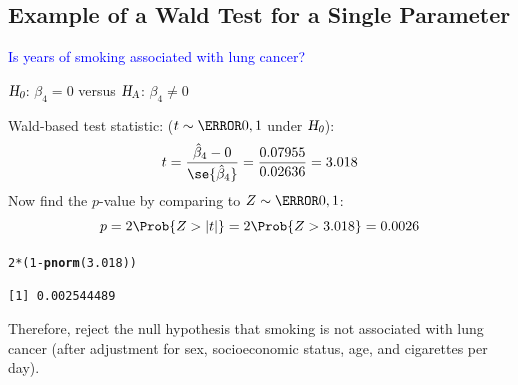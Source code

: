 \documentclass[oneside]{book}\usepackage[]{graphicx}\usepackage[svgnames]{xcolor}
\makeatletter
\newcommand{\hlnum}[1]{\textcolor[rgb]{0.686,0.059,0.569}{#1}}%
\newcommand{\hlopt}[1]{\textcolor[rgb]{0,0,0}{#1}}%
\newcommand{\hlstd}[1]{\textcolor[rgb]{0.345,0.345,0.345}{#1}}%
\newcommand{\hlkwd}[1]{\textcolor[rgb]{0.737,0.353,0.396}{\textbf{#1}}}%
\newenvironment{kframe}{%
 \def\at@end@of@kframe{}%
 \ifinner\ifhmode%
  \def\at@end@of@kframe{\end{minipage}}%
  \begin{minipage}{\columnwidth}%
 \fi\fi%
 \def\FrameCommand##1{\hskip\@totalleftmargin \hskip-\fboxsep
 \colorbox{shadecolor}{##1}\hskip-\fboxsep
     \hskip-\linewidth \hskip-\@totalleftmargin \hskip\columnwidth}%
 \MakeFramed {\advance\hsize-\width
   \@totalleftmargin\z@ \linewidth\hsize
   \@setminipage}}%
 {\par\unskip\endMakeFramed%
 \at@end@of@kframe}
\newenvironment{knitrout}{}{} %
\newcommand{\HN}{\textsl{H}_{\textsl{0}}}%
\newcommand{\HA}{\textsl{H}_{\textsl{A}}}%
\DeclarePairedDelimiter\abs{\lvert}{\rvert}
\makeatother
\begin{document}
\subsection*{Example of a Wald Test for a Single Parameter}
\textcolor{Blue}{Is years of smoking associated with lung cancer?}
\begin{center}
      $ \HN $: $ \beta_4=0 $ versus $ \HA $: $ \beta_4\ne 0 $
\end{center}
Wald-based test statistic: ($ t \sim \N{0,1} $ under $ \HN $):
\[ t=\frac{\hat{\beta}_4-0}{\se{\hat{\beta}_4}}=\frac{0.07955}{0.02636}=3.018   \]
Now find the $ p $-value by comparing to $ Z \sim \N{0,1} $:
\[ p=2\Prob{Z>\abs{t}}=2\Prob{Z>3.018}=0.0026 \]
\begin{knitrout}
\color{fgcolor}\begin{kframe}
\begin{alltt}
\hlnum{2} \hlopt{*} \hlstd{(}\hlnum{1} \hlopt{-} \hlkwd{pnorm}\hlstd{(}\hlnum{3.018}\hlstd{))}
\end{alltt}
\begin{verbatim}
[1] 0.002544489
\end{verbatim}
\end{kframe}
\end{knitrout}
Therefore, reject the null hypothesis that smoking is not associated with lung cancer (after adjustment for sex, socioeconomic status, age, and cigarettes per day).
\end{document}
